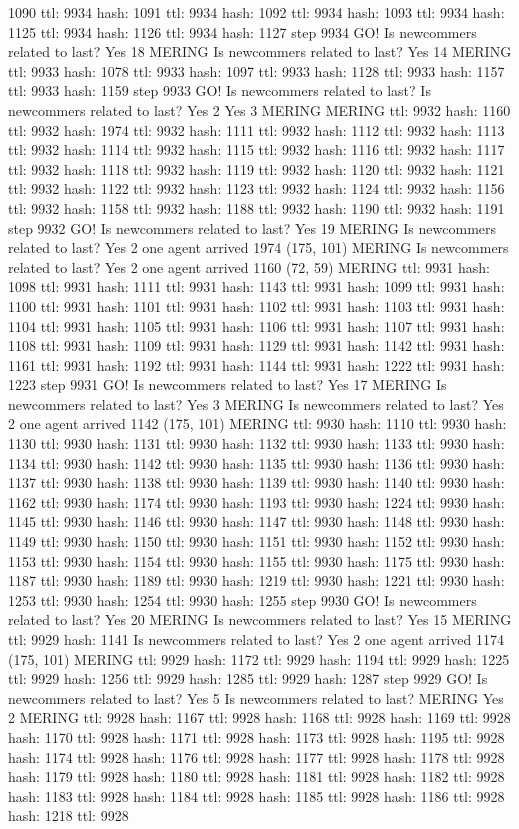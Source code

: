 1090 ttl: 9934 hash: 1091 ttl: 9934 hash: 1092 ttl: 9934 hash: 1093 ttl: 9934 hash: 1125 ttl: 9934 hash: 1126 ttl: 9934 hash: 1127 step 9934 GO! Is newcommers related to last? Yes 18 MERING Is newcommers related to last? Yes 14 MERING ttl: 9933 hash: 1078 ttl: 9933 hash: 1097 ttl: 9933 hash: 1128 ttl: 9933 hash: 1157 ttl: 9933 hash: 1159 step 9933 GO! Is newcommers related to last? Is newcommers related to last? Yes 2 Yes 3 MERING MERING ttl: 9932 hash: 1160 ttl: 9932 hash: 1974 ttl: 9932 hash: 1111 ttl: 9932 hash: 1112 ttl: 9932 hash: 1113 ttl: 9932 hash: 1114 ttl: 9932 hash: 1115 ttl: 9932 hash: 1116 ttl: 9932 hash: 1117 ttl: 9932 hash: 1118 ttl: 9932 hash: 1119 ttl: 9932 hash: 1120 ttl: 9932 hash: 1121 ttl: 9932 hash: 1122 ttl: 9932 hash: 1123 ttl: 9932 hash: 1124 ttl: 9932 hash: 1156 ttl: 9932 hash: 1158 ttl: 9932 hash: 1188 ttl: 9932 hash: 1190 ttl: 9932 hash: 1191 step 9932 GO! Is newcommers related to last? Yes 19 MERING Is newcommers related to last? Yes 2 one agent arrived 1974 (175, 101) MERING Is newcommers related to last? Yes 2 one agent arrived 1160 (72, 59) MERING ttl: 9931 hash: 1098 ttl: 9931 hash: 1111 ttl: 9931 hash: 1143 ttl: 9931 hash: 1099 ttl: 9931 hash: 1100 ttl: 9931 hash: 1101 ttl: 9931 hash: 1102 ttl: 9931 hash: 1103 ttl: 9931 hash: 1104 ttl: 9931 hash: 1105 ttl: 9931 hash: 1106 ttl: 9931 hash: 1107 ttl: 9931 hash: 1108 ttl: 9931 hash: 1109 ttl: 9931 hash: 1129 ttl: 9931 hash: 1142 ttl: 9931 hash: 1161 ttl: 9931 hash: 1192 ttl: 9931 hash: 1144 ttl: 9931 hash: 1222 ttl: 9931 hash: 1223 step 9931 GO! Is newcommers related to last? Yes 17 MERING Is newcommers related to last? Yes 3 MERING Is newcommers related to last? Yes 2 one agent arrived 1142 (175, 101) MERING ttl: 9930 hash: 1110 ttl: 9930 hash: 1130 ttl: 9930 hash: 1131 ttl: 9930 hash: 1132 ttl: 9930 hash: 1133 ttl: 9930 hash: 1134 ttl: 9930 hash: 1142 ttl: 9930 hash: 1135 ttl: 9930 hash: 1136 ttl: 9930 hash: 1137 ttl: 9930 hash: 1138 ttl: 9930 hash: 1139 ttl: 9930 hash: 1140 ttl: 9930 hash: 1162 ttl: 9930 hash: 1174 ttl: 9930 hash: 1193 ttl: 9930 hash: 1224 ttl: 9930 hash: 1145 ttl: 9930 hash: 1146 ttl: 9930 hash: 1147 ttl: 9930 hash: 1148 ttl: 9930 hash: 1149 ttl: 9930 hash: 1150 ttl: 9930 hash: 1151 ttl: 9930 hash: 1152 ttl: 9930 hash: 1153 ttl: 9930 hash: 1154 ttl: 9930 hash: 1155 ttl: 9930 hash: 1175 ttl: 9930 hash: 1187 ttl: 9930 hash: 1189 ttl: 9930 hash: 1219 ttl: 9930 hash: 1221 ttl: 9930 hash: 1253 ttl: 9930 hash: 1254 ttl: 9930 hash: 1255 step 9930 GO! Is newcommers related to last? Yes 20 MERING Is newcommers related to last? Yes 15 MERING ttl: 9929 hash: 1141 Is newcommers related to last? Yes 2 one agent arrived 1174 (175, 101) MERING ttl: 9929 hash: 1172 ttl: 9929 hash: 1194 ttl: 9929 hash: 1225 ttl: 9929 hash: 1256 ttl: 9929 hash: 1285 ttl: 9929 hash: 1287 step 9929 GO! Is newcommers related to last? Yes 5 Is newcommers related to last? MERING Yes 2 MERING ttl: 9928 hash: 1167 ttl: 9928 hash: 1168 ttl: 9928 hash: 1169 ttl: 9928 hash: 1170 ttl: 9928 hash: 1171 ttl: 9928 hash: 1173 ttl: 9928 hash: 1195 ttl: 9928 hash: 1174 ttl: 9928 hash: 1176 ttl: 9928 hash: 1177 ttl: 9928 hash: 1178 ttl: 9928 hash: 1179 ttl: 9928 hash: 1180 ttl: 9928 hash: 1181 ttl: 9928 hash: 1182 ttl: 9928 hash: 1183 ttl: 9928 hash: 1184 ttl: 9928 hash: 1185 ttl: 9928 hash: 1186 ttl: 9928 hash: 1218 ttl: 9928 